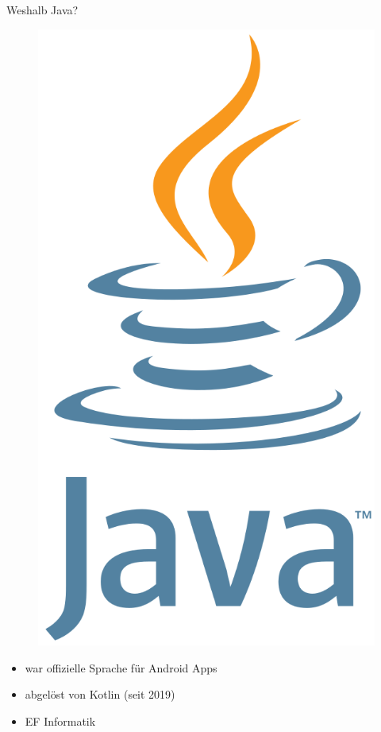 \documentclass[aspectratio=169]{beamer}
\begin{document}
\begin{frame}[plain]{Weshalb Java?}
\begin{varwidth}{.3\textwidth}
        \begin{figure}
            \centering
            \includegraphics[height=.8\textheight]{media/java-logo.png}
        \end{figure}
    \end{varwidth}
    \hfill
    \begin{varwidth}{.6\textwidth}
        \begin{itemize}\pause
            \item war offizielle Sprache für Android Apps\pause
            \item abgelöst von Kotlin (seit 2019)\pause
            \item EF Informatik
        \end{itemize}
    \end{varwidth} 
\end{frame}
\end{document}
